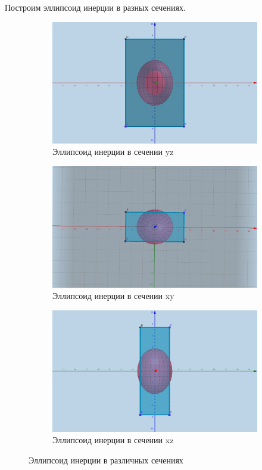 \documentclass[a4paper, 12pt]{article}
\begin{document}
Построим эллипсоид инерции в разных сечениях.
\begin{figure}
    \begin{subfigure}{\linewidth}
    \centering
    \includegraphics[width=.75\linewidth]{ellipsis1.png}
	\caption{Эллипсоид инерции в сечении yz}
    \end{subfigure}\par\medskip
    \begin{subfigure}{\linewidth}
    \centering
    \includegraphics[width=.75\linewidth]{ellipsis2.png}
	\caption{Эллипсоид инерции в сечении xy}
    \end{subfigure}\par\medskip
    \begin{subfigure}{\linewidth}
    \centering
    \includegraphics[width=.75\linewidth]{ellipsis3.png}
	\caption{Эллипсоид инерции в сечении xz}
    \label{pic:graph}
    \end{subfigure}\par\medskip
	\caption{Эллипсоид инерции в различных сечениях}
\end{figure}
\end{document}
